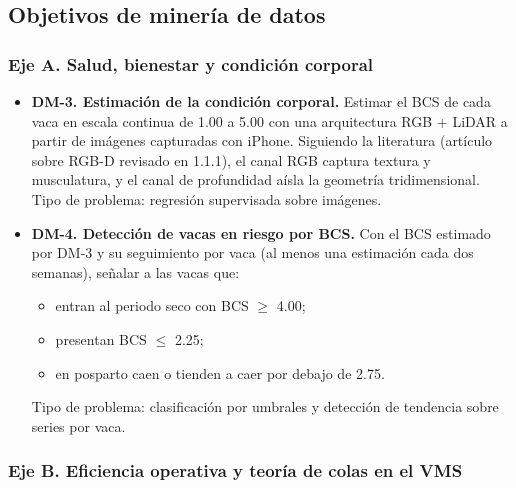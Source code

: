 \subsection{Objetivos de minería de datos}

\subsubsection{Eje A. Salud, bienestar y condición corporal}

\begin{itemize}
  \item \textbf{DM-3. Estimación de la condición corporal.} Estimar el BCS de cada vaca en escala continua de 1.00 a 5.00 con una arquitectura RGB + LiDAR a partir de imágenes capturadas con iPhone. Siguiendo la literatura (artículo sobre RGB-D revisado en 1.1.1), el canal RGB captura textura y musculatura, y el canal de profundidad aísla la geometría tridimensional. Tipo de problema: regresión supervisada sobre imágenes.
  \item \textbf{DM-4. Detección de vacas en riesgo por BCS.} Con el BCS estimado por DM-3 y su seguimiento por vaca (al menos una estimación cada dos semanas), señalar a las vacas que:
  \begin{itemize}
    \item entran al periodo seco con BCS $\geq$ 4.00;
    \item presentan BCS $\leq$ 2.25;
    \item en posparto caen o tienden a caer por debajo de 2.75.
  \end{itemize}
  Tipo de problema: clasificación por umbrales y detección de tendencia sobre series por vaca.
\end{itemize}

\subsubsection{Eje B. Eficiencia operativa y teoría de colas en el VMS}


